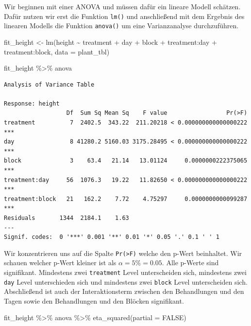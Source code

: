 \documentclass[
  letterpaper,
  DIV=11,
  oneside]{scrreport}
\newenvironment{Shaded}{\begin{snugshade}}{\end{snugshade}}
\newcommand{\AttributeTok}[1]{\textcolor[rgb]{0.40,0.45,0.13}{#1}}
\newcommand{\ConstantTok}[1]{\textcolor[rgb]{0.56,0.35,0.01}{#1}}
\newcommand{\FunctionTok}[1]{\textcolor[rgb]{0.28,0.35,0.67}{#1}}
\newcommand{\NormalTok}[1]{\textcolor[rgb]{0.00,0.23,0.31}{#1}}
\newcommand{\OtherTok}[1]{\textcolor[rgb]{0.00,0.23,0.31}{#1}}
\newcommand{\SpecialCharTok}[1]{\textcolor[rgb]{0.37,0.37,0.37}{#1}}
\begin{document}
Wir beginnen mit einer ANOVA und müssen dafür ein lineare Modell
schätzen. Dafür nutzen wir erst die Funktion \texttt{lm()} und
anschließend mit dem Ergebnis des linearen Modells die Funktion
\texttt{anova()} um eine Varianzanalyse durchzuführen.

\begin{Shaded}
\begin{Highlighting}[]
\NormalTok{fit\_height }\OtherTok{\textless{}{-}} \FunctionTok{lm}\NormalTok{(height }\SpecialCharTok{\textasciitilde{}}\NormalTok{ treatment }\SpecialCharTok{+}\NormalTok{ day }\SpecialCharTok{+}\NormalTok{ block }\SpecialCharTok{+} 
\NormalTok{                   treatment}\SpecialCharTok{:}\NormalTok{day }\SpecialCharTok{+}\NormalTok{ treatment}\SpecialCharTok{:}\NormalTok{block, }
                 \AttributeTok{data =}\NormalTok{ plant\_tbl)}

\NormalTok{fit\_height }\SpecialCharTok{\%\textgreater{}\%}\NormalTok{ anova}
\end{Highlighting}
\end{Shaded}

\begin{verbatim}
Analysis of Variance Table

Response: height
                  Df  Sum Sq Mean Sq    F value                 Pr(>F)    
treatment          7  2402.5  343.22  211.20218 < 0.000000000000000222 ***
day                8 41280.2 5160.03 3175.28495 < 0.000000000000000222 ***
block              3    63.4   21.14   13.01124     0.0000000222375065 ***
treatment:day     56  1076.3   19.22   11.82650 < 0.000000000000000222 ***
treatment:block   21   162.2    7.72    4.75297     0.0000000000099287 ***
Residuals       1344  2184.1    1.63                                      
---
Signif. codes:  0 '***' 0.001 '**' 0.01 '*' 0.05 '.' 0.1 ' ' 1
\end{verbatim}

Wir konzentrieren uns auf die Spalte \texttt{Pr(\textgreater{}F)} welche
den p-Wert beinhaltet. Wir schauen welcher p-Wert kleiner ist als
\(\alpha = 5\% = 0.05\). Alle p-Werte sind signifikant. Mindestens zwei
\texttt{treatment} Level unterscheiden sich, mindestens zwei
\texttt{day} Level unterschieden sich und mindestens zwei \texttt{block}
Level unterscheiden sich. Abschließend ist auch der Interaktionsterm
zwischen den Behandlungen und den Tagen sowie den Behandlungen und den
Blöcken signifikant.

\begin{Shaded}
\begin{Highlighting}[]
\NormalTok{fit\_height }\SpecialCharTok{\%\textgreater{}\%}\NormalTok{ anova }\SpecialCharTok{\%\textgreater{}\%} \FunctionTok{eta\_squared}\NormalTok{(}\AttributeTok{partial =} \ConstantTok{FALSE}\NormalTok{)}
\end{Highlighting}
\end{Shaded}
\end{document}
